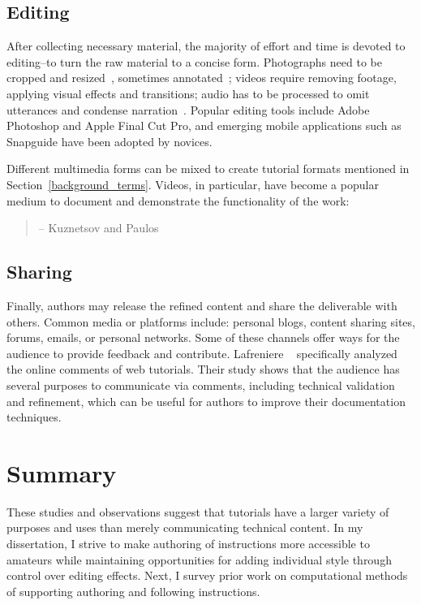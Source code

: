 \subsection{Editing}
After collecting necessary material, the majority of effort and time is devoted to editing--to turn the raw material to a concise form.
Photographs need to be cropped and resized~\cite{Tseng:2014:PVP:2598510.2598540}, sometimes annotated~\cite{Torrey:2007he}; videos require removing footage, applying visual effects and transitions; audio has to be processed to omit utterances and condense narration~\cite{Chi:2013:DGC:2501988.2502052}. Popular editing tools include Adobe Photoshop and Apple Final Cut Pro, and emerging mobile applications such as Snapguide have been adopted by novices.

Different multimedia forms can be mixed to create tutorial formats mentioned in Section~\ref{background_terms}. Videos, in particular, have become a popular medium to document and demonstrate the functionality of the work:

\begin{quote}
 -- Kuznetsov and Paulos~\cite{Kuznetsov:2010:REA:1868914.1868950}
\end{quote}

\subsection{Sharing}
Finally, authors may release the refined content and share the deliverable with others. Common media or platforms include: personal blogs, content sharing sites, forums, emails, or personal networks.
%
Some of these channels offer ways for the audience to provide feedback and contribute. Lafreniere \ea{}~\cite{Lafreniere:2012tl} specifically analyzed the online comments of web tutorials. Their study shows that the audience has several purposes to communicate via comments, including technical validation and refinement, which can be useful for authors to improve their documentation techniques.



\section{Summary}

These studies and observations suggest that tutorials have a larger variety of purposes and uses than merely communicating technical content.
%
In my dissertation, I strive to make authoring of instructions more accessible to amateurs while maintaining opportunities for adding individual style through control over editing effects.
%
Next, I survey prior work on computational methods of supporting authoring and following instructions.
